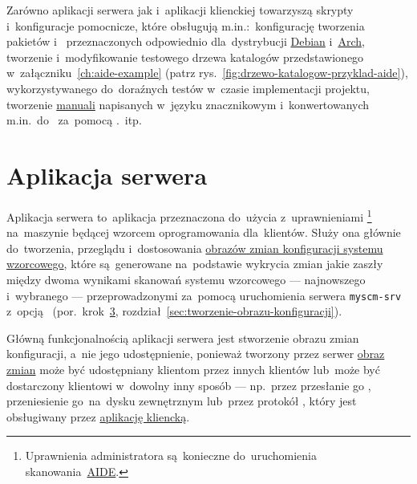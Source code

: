 \documentclass[thesis]{subfiles}
\begin{document}
Zarówno aplikacji serwera jak i~aplikacji klienckiej towarzyszą skrypty i~konfiguracje pomocnicze, które obsługują m.in.:~konfigurację tworzenia pakietów  i~ przeznaczonych odpowiednio dla~dystrybucji  \href{https://en.wikipedia.org/wiki/Debian}{Debian} i~\href{https://en.wikipedia.org/wiki/Arch_Linux}{Arch}, tworzenie i~modyfikowanie testowego drzewa katalogów przedstawionego w~załączniku~\ref{ch:aide-example} (patrz rys.~\ref{fig:drzewo-katalogow-przyklad-aide}), wykorzystywanego do~doraźnych testów w~czasie implementacji projektu, tworzenie \href{https://en.wikipedia.org/wiki/User_guide}{manuali} napisanych w~języku znacznikowym  i~konwertowanych m.in.~do~ za~pomocą .~itp.


\section{Aplikacja serwera}
\label{sec:srv-app}

Aplikacja serwera to~aplikacja przeznaczona do~użycia z~uprawnieniami \footnote{Uprawnienia administratora są~konieczne do~uruchomienia skanowania~\hyperref[sec:aide]{AIDE}.} na~maszynie będącej wzorcem oprogramowania dla~klientów. Służy ona głównie do~tworzenia, przeglądu i~dostosowania \hyperref[sec:obraz-zmian-konfiguracji]{obrazów zmian konfiguracji systemu wzorcowego}, które są~generowane na~podstawie wykrycia zmian jakie zaszły między dwoma wynikami skanowań systemu wzorcowego --- najnowszego i~wybranego --- przeprowadzonymi za~pomocą uruchomienia serwera \texttt{myscm-srv} z~opcją ~(por.~krok~\hyperlink{itm:stworzenie-obrazu-konfiguracji}{3}, rozdział~\ref{sec:tworzenie-obrazu-konfiguracji}).

Główną funkcjonalnością aplikacji serwera jest stworzenie obrazu zmian konfiguracji, a~nie jego udostępnienie, ponieważ tworzony przez serwer \hyperref[sec:obraz-zmian-konfiguracji]{obraz zmian} może być udostępniany klientom przez innych klientów lub~może być dostarczony klientowi w~dowolny inny sposób --- np.~przez przesłanie go , przeniesienie go~na~dysku zewnętrznym lub~przez protokół \sftp{}, który jest obsługiwany przez \hyperref[sec:cli-app]{aplikację kliencką}.
\end{document}
